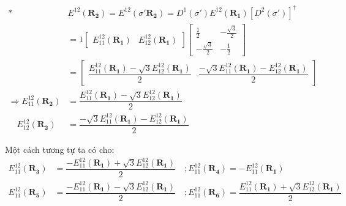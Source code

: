 \documentclass{article}
\begin{document}
\begin{align*}
    \ast                                  & E^{12}(\mathbf{R_2})             = E^{12}(\sigma'\mathbf{R_2}) = D^1(\sigma') E^{12}(\mathbf{R_1}) \left[D^2(\sigma')\right]^\dagger \\
                                          & = 1
    \begin{bmatrix}
        E_{11}^{12}(\mathbf{R_1}) & E_{12}^{12}(\mathbf{R_1})
    \end{bmatrix}
    \begin{bmatrix}
        \frac{1}{2}         & -\frac{\sqrt{3}}{2} \\
        -\frac{\sqrt{3}}{2} & -\frac{1}{2}
    \end{bmatrix}                                                                                                                     \\
                                          & =
    \begin{bmatrix}
        \dfrac{E_{11}^{12}(\mathbf{R_1}) - \sqrt{3}E_{12}^{12}(\mathbf{R_1})}{2} & \dfrac{ -\sqrt{3}E_{11}^{12}(\mathbf{R_1}) - E_{12}^{12}(\mathbf{R_1})}{2}
    \end{bmatrix}                        \\
    \Rightarrow E_{11}^{12}(\mathbf{R_2}) & = \dfrac{E_{11}^{12}(\mathbf{R_1}) - \sqrt{3}E_{12}^{12}(\mathbf{R_1})}{2}                                                           \\
    \quad E_{12}^{12}(\mathbf{R_2})       & = \dfrac{ -\sqrt{3}E_{11}^{12}(\mathbf{R_1}) - E_{12}^{12}(\mathbf{R_1})}{2}
\end{align*}

Một cách tương tự ta có cho:
\begin{align*}
    E_{11}^{12}(\mathbf{R_3}) & =  \dfrac{ -E_{11}^{12}(\mathbf{R_1}) + \sqrt{3} E_{12}^{12}(\mathbf{R_1})}{2} \quad ;  E_{11}^{12}(\mathbf{R_4}) = - E_{11}^{12}(\mathbf{R_1})                                                 \\
    E_{11}^{12}(\mathbf{R_5}) & =  \dfrac{ -E_{11}^{12}(\mathbf{R_1}) - \sqrt{3} E_{12}^{12}(\mathbf{R_1})}{2} \quad ; E_{11}^{12}(\mathbf{R_6})  =  \dfrac{ E_{11}^{12}(\mathbf{R_1}) + \sqrt{3} E_{12}^{12}(\mathbf{R_1})}{2}
\end{align*}
\end{document}
